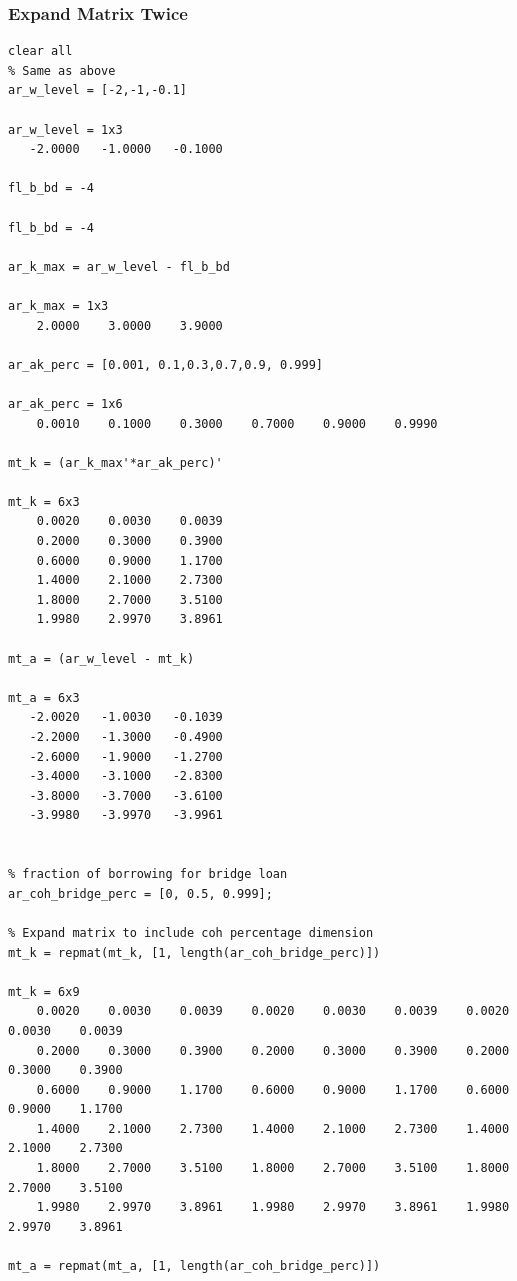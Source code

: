 \documentclass[
]{book}
\begin{document}
\hypertarget{expand-matrix-twice}{%
\subsubsection{Expand Matrix Twice}\label{expand-matrix-twice}}

\begin{verbatim}
clear all
% Same as above
ar_w_level = [-2,-1,-0.1]

ar_w_level = 1x3    
   -2.0000   -1.0000   -0.1000

fl_b_bd = -4

fl_b_bd = -4

ar_k_max = ar_w_level - fl_b_bd

ar_k_max = 1x3    
    2.0000    3.0000    3.9000

ar_ak_perc = [0.001, 0.1,0.3,0.7,0.9, 0.999]

ar_ak_perc = 1x6    
    0.0010    0.1000    0.3000    0.7000    0.9000    0.9990

mt_k = (ar_k_max'*ar_ak_perc)'

mt_k = 6x3    
    0.0020    0.0030    0.0039
    0.2000    0.3000    0.3900
    0.6000    0.9000    1.1700
    1.4000    2.1000    2.7300
    1.8000    2.7000    3.5100
    1.9980    2.9970    3.8961

mt_a = (ar_w_level - mt_k)

mt_a = 6x3    
   -2.0020   -1.0030   -0.1039
   -2.2000   -1.3000   -0.4900
   -2.6000   -1.9000   -1.2700
   -3.4000   -3.1000   -2.8300
   -3.8000   -3.7000   -3.6100
   -3.9980   -3.9970   -3.9961


% fraction of borrowing for bridge loan
ar_coh_bridge_perc = [0, 0.5, 0.999];

% Expand matrix to include coh percentage dimension
mt_k = repmat(mt_k, [1, length(ar_coh_bridge_perc)])

mt_k = 6x9    
    0.0020    0.0030    0.0039    0.0020    0.0030    0.0039    0.0020    0.0030    0.0039
    0.2000    0.3000    0.3900    0.2000    0.3000    0.3900    0.2000    0.3000    0.3900
    0.6000    0.9000    1.1700    0.6000    0.9000    1.1700    0.6000    0.9000    1.1700
    1.4000    2.1000    2.7300    1.4000    2.1000    2.7300    1.4000    2.1000    2.7300
    1.8000    2.7000    3.5100    1.8000    2.7000    3.5100    1.8000    2.7000    3.5100
    1.9980    2.9970    3.8961    1.9980    2.9970    3.8961    1.9980    2.9970    3.8961

mt_a = repmat(mt_a, [1, length(ar_coh_bridge_perc)])


\end{verbatim}
\end{document}
